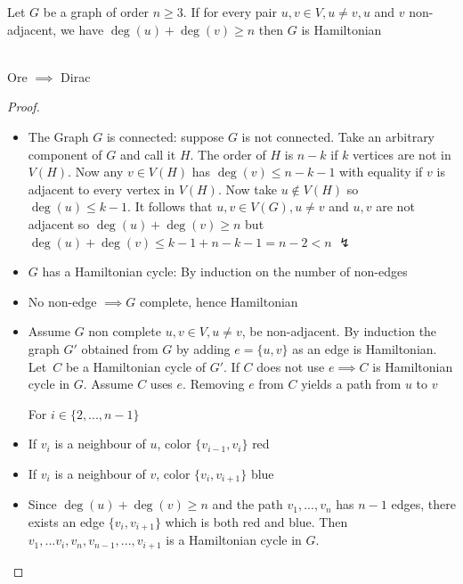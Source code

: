 \begin{theorem}\label{1.13}
    Let $G$ be a graph of order $n\geq3$. If for every pair $u,v\in V,u\neq v,u$ and $v$ non-adjacent, we have $\deg(u)+\deg(v)\geq n$ then $G$ is Hamiltonian
\end{theorem}
\begin{remark}\label{1.14}
\hfill \\
    Ore $\implies$ Dirac
\end{remark}
\begin{proof}
    \begin{itemize}
    \hfill \\
        \item The Graph $G$ is connected: suppose $G$ is not connected. Take an arbitrary component of $G$ and call it $H$. The order of $H$ is $n-k$ if $k$ vertices are not in $V(H)$. Now any $v\in V(H)$ has $\deg(v)\leq n-k-1$ with equality if $v$ is adjacent to every vertex in $V(H)$. Now take $u\notin V(H)$ so $\deg(u)\leq k-1$. It follows that $u,v\in V(G),u\neq v$ and $u,v$ are not adjacent so $\deg(u)+\deg(v)\geq n$ but $\deg(u)+\deg(v)\leq k-1+n-k-1=n-2<n$ $\lightning$
        \item $G$ has a Hamiltonian cycle: By induction on the number of non-edges
        \item No non-edge $\implies G$ complete, hence Hamiltonian
        \item Assume $G$ non complete $u,v\in V, u\neq v$, be non-adjacent. By induction the graph $G'$ obtained from $G$ by adding $e=\{u,v\}$ as an edge is Hamiltonian. Let~$C$ be a Hamiltonian cycle of $G'$. If $C$ does not use $e\implies C$ is Hamiltonian cycle in $G$. Assume $C$ uses $e$. Removing $e$ from $C$ yields a path from $u$ to $v$\par
        For $i\in\{2,...,n-1\}$
        \item If $v_i$ is a neighbour of $u$, color $\{v_{i-1},v_i\}$ red
        \item If $v_i$ is a neighbour of $v$, color $\{v_{i},v_{i+1}\}$ blue
        \item Since $\deg(u)+\deg(v)\geq n$ and the path $v_1,...,v_n$ has $n-1$ edges, there exists an edge $\{v_{i},v_{i+1}\}$ which is both red and blue. Then $v_1,...v_i,v_n,v_{n-1},...,v_{i+1}$ is a Hamiltonian cycle in $G$.
    \end{itemize}
    \begin{center}
\end{center}
\end{proof}
